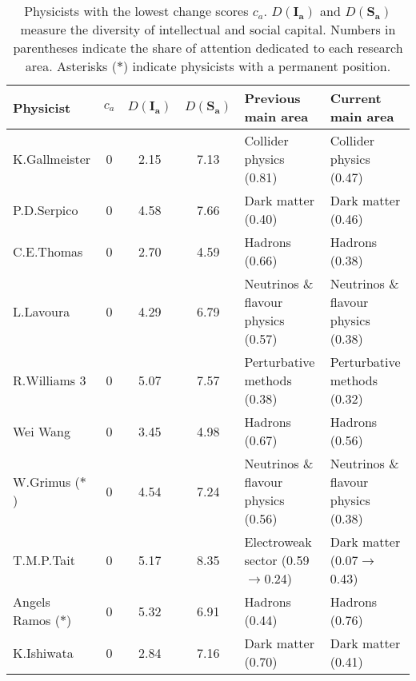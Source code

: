 \begin{table}[H]
\centering
\caption{Physicists with the lowest change scores $c_a$. $D(\bm{I_a})$ and $D(\bm{S_a})$ measure the diversity of intellectual and social capital. Numbers in parentheses indicate the share of attention dedicated to each research area. Asterisks ($\ast$) indicate physicists with a permanent position.}
\label{table:low_exited}
\begin{tabular}{p{}|c|c|c|b{}|b{}}
\toprule
            Physicist & $c_a$ & $D(\bm{I_a})$ & $D(\bm{S_a})$ &                            Previous main area &                      Current main area \\
\midrule
        K.Gallmeister &     0 &          2.15 &          7.13 &                       Collider physics (0.81) &             Collider physics (0.47)\\ \hline
          P.D.Serpico &     0 &          4.58 &          7.66 &                            Dark matter (0.40) &                  Dark matter (0.46)\\ \hline
           C.E.Thomas &     0 &          2.70 &          4.59 &                                Hadrons (0.66) &                      Hadrons (0.38)\\ \hline
            L.Lavoura &     0 &          4.29 &          6.79 &           Neutrinos \& flavour physics (0.57) & Neutrinos \& flavour physics (0.38)\\ \hline
         R.Williams 3 &     0 &          5.07 &          7.57 &                   Perturbative methods (0.38) &         Perturbative methods (0.32)\\ \hline
             Wei Wang &     0 &          3.45 &          4.98 &                                Hadrons (0.67) &                      Hadrons (0.56)\\ \hline
    W.Grimus ($\ast$) &     0 &          4.54 &          7.24 &           Neutrinos \& flavour physics (0.56) & Neutrinos \& flavour physics (0.38)\\ \hline
           T.M.P.Tait &     0 &          5.17 &          8.35 &            Electroweak sector (0.59$\to$0.24) &         Dark matter (0.07$\to$0.43)\\ \hline
Angels Ramos ($\ast$) &     0 &          5.32 &          6.91 &                                Hadrons (0.44) &                      Hadrons (0.76)\\ \hline
           K.Ishiwata &     0 &          2.84 &          7.16 &                            Dark matter (0.70) &                  Dark matter (0.41)\\ \hline

\end{tabular}
\end{table}
